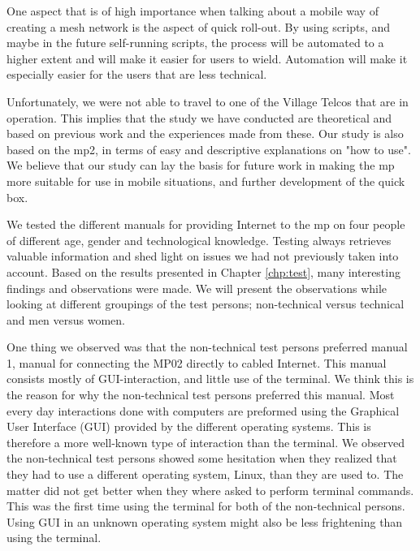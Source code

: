 One aspect that is of high importance when talking about a mobile way of creating a mesh network is the aspect of quick roll-out. By using scripts, and maybe in the future self-running scripts, the process will be automated to a higher extent and will make it easier for users to wield. Automation will make it especially easier for the users that are less technical. 

Unfortunately, we were not able to travel to one of the Village Telcos that are in operation. This implies that the study we have conducted are theoretical and based on previous work and the experiences made from these. Our study is also based on the \gls{mp2}, in terms of easy and descriptive explanations on "how to use". We believe that our study can lay the basis for future work in making the \gls{mp} more suitable for use in mobile situations, and further development of the \gls{quick} box. 

We tested the different manuals for providing Internet to the \gls{mp} on four people of different age, gender and technological knowledge. Testing always retrieves valuable information and shed light on issues we had not previously taken into account. Based on the results presented in Chapter \ref{chp:test}, many interesting findings and observations were made. We will present the observations while looking at different groupings of the test persons; non-technical versus technical and men versus women. 

One thing we observed was that the non-technical test persons preferred manual 1, manual for connecting the MP02 directly to cabled Internet. This manual consists mostly of GUI-interaction, and little use of the terminal. We think this is the reason for why the non-technical test persons preferred this manual. Most every day interactions done with computers are preformed using the Graphical User Interface (GUI) provided by the different operating systems.  This is therefore a more well-known type of interaction than the terminal. We observed the non-technical test persons showed some hesitation when they realized that they had to use a different operating system, Linux, than they are used to. The matter did not get better when they where asked to perform terminal commands. This was the first time using the terminal for both of the non-technical persons. Using GUI in an unknown operating system might also be less frightening than using the terminal. 

